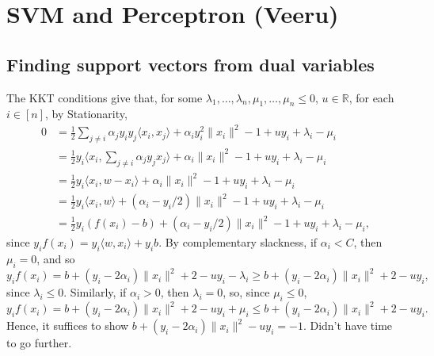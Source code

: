 \documentclass[11pt]{article}
\newcommand{\R}{\mathbb{R}} %
\begin{document}
\section{SVM and Perceptron (Veeru)}
\subsection{Finding support vectors from dual variables}
The KKT conditions give that, for some
$\lambda_1,\dots,\lambda_n,\mu_1,\dots,\mu_n \leq 0$, $u \in \R$, for each
$i \in [n]$, by Stationarity,
\begin{align*}
0
 &  = \frac{1}{2} \sum_{j \neq i} \alpha_jy_iy_j \langle x_i, x_j \rangle
        + \alpha_iy_i^2 \|x_i\|^2 - 1
        + uy_i + \lambda_i - \mu_i \\
 &  = \frac{1}{2} y_i \langle x_i, \sum_{j \neq i} \alpha_j y_j x_j \rangle
        + \alpha_i \|x_i\|^2 - 1
        + uy_i + \lambda_i - \mu_i \\
 &  = \frac{1}{2} y_i \langle x_i, w - x_i \rangle
        + \alpha_i \|x_i\|^2 - 1
        + uy_i + \lambda_i - \mu_i  \\
 &  = \frac{1}{2} y_i \langle x_i, w \rangle
        + (\alpha_i - y_i/2) \|x_i\|^2 - 1
        + uy_i + \lambda_i - \mu_i  \\
 &  = \frac{1}{2} y_i (f(x_i) - b)
        + (\alpha_i - y_i/2) \|x_i\|^2 - 1
        + uy_i + \lambda_i - \mu_i,
\end{align*}
since $y_if(x_i) = y_i \langle w, x_i \rangle + y_ib$. By complementary
slackness, if $\alpha_i < C$, then $\mu_i = 0$, and so
\[y_if(x_i)
    = b + (y_i - 2\alpha_i)\|x_i\|^2 + 2 - uy_i - \lambda_i
    \geq b + (y_i - 2\alpha_i)\|x_i\|^2 + 2 - uy_i,
\]
since $\lambda_i \leq 0$. Similarly, if $\alpha_i > 0$, then $\lambda_i = 0$,
so, since $\mu_i \leq 0$,
\[y_if(x_i)
    = b + (y_i - 2\alpha_i)\|x_i\|^2 + 2 - uy_i + \mu_i
    \leq b + (y_i - 2\alpha_i)\|x_i\|^2 + 2 - uy_i.
\]
Hence, it suffices to show $b + (y_i - 2\alpha_i)\|x_i\|^2 - uy_i = -1$. Didn't
have time to go further. \frownie
\end{document}
